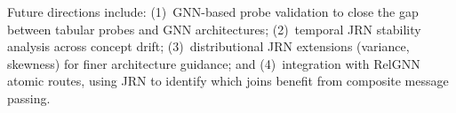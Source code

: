 \documentclass[11pt,letterpaper]{article}
\begin{document}
Future directions include: (1)~GNN-based probe validation to close the gap between tabular probes and GNN architectures; (2)~temporal JRN stability analysis across concept drift; (3)~distributional JRN extensions (variance, skewness) for finer architecture guidance; and (4)~integration with RelGNN~\citep{Chen2025} atomic routes, using JRN to identify which joins benefit from composite message passing.



\end{document}
